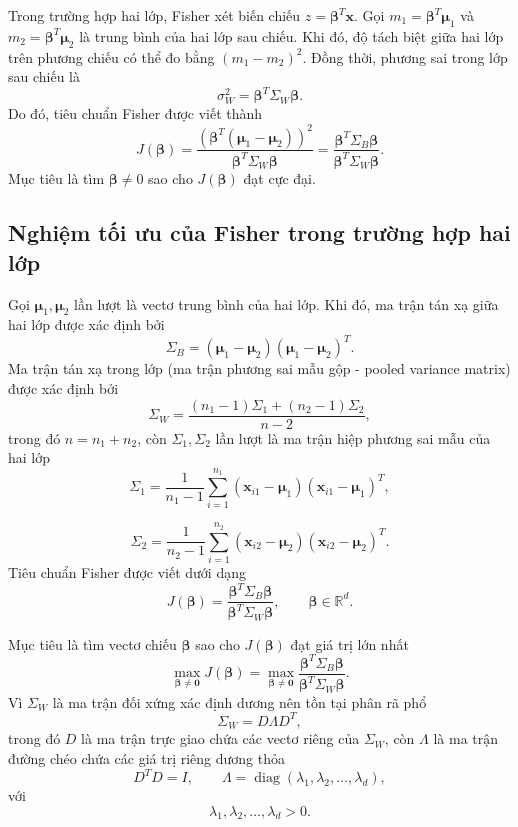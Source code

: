 Trong trường hợp hai lớp, Fisher xét biến chiếu $z = \bm{\beta}^T \bm{x}$. Gọi $m_1 = \bm{\beta}^T \bm{\mu}_1$ và $m_2 = \bm{\beta}^T \bm{\mu}_2$ là trung bình của hai lớp sau chiếu. Khi đó, độ tách biệt giữa hai lớp trên phương chiếu có thể đo bằng $(m_1-m_2)^2$. Đồng thời, phương sai trong lớp sau chiếu là
\begin{equation}
\sigma_W^2 = \bm{\beta}^T \Sigma_W \bm{\beta}.
\end{equation}
Do đó, tiêu chuẩn Fisher được viết thành
\begin{equation}
J(\bm{\beta})
=
\frac{(\bm{\beta}^T(\bm{\mu}_1-\bm{\mu}_2))^2}{\bm{\beta}^T \Sigma_W \bm{\beta}}
=
\frac{\bm{\beta}^T \Sigma_B \bm{\beta}}{\bm{\beta}^T \Sigma_W \bm{\beta}}.
\end{equation}
Mục tiêu là tìm $\bm{\beta} \neq 0$ sao cho $J(\bm{\beta})$ đạt cực đại.

\subsection{Nghiệm tối ưu của Fisher trong trường hợp hai lớp}
Gọi $\bm{\mu}_1,\bm{\mu}_2$ lần lượt là vectơ trung bình của hai lớp. Khi đó, ma trận tán xạ giữa hai lớp được xác định bởi
\[
\Sigma_B
=
(\bm{\mu}_1-\bm{\mu}_2)(\bm{\mu}_1-\bm{\mu}_2)^T.
\]
Ma trận tán xạ trong lớp (ma trận phương sai mẫu gộp - pooled variance matrix) được xác định bởi
\[
\Sigma_W
=
\frac{(n_1-1)\Sigma_1+(n_2-1)\Sigma_2}{n-2},
\]
trong đó $n=n_1+n_2$, còn $\Sigma_1,\Sigma_2$ lần lượt là ma trận hiệp phương sai mẫu của hai lớp
\[
\Sigma_1
=
\frac{1}{n_1-1}
\sum_{i=1}^{n_1}
(\bm{x}_{i1}-\bm{\mu}_1)(\bm{x}_{i1}-\bm{\mu}_1)^T,
\]

\[
\Sigma_2
=
\frac{1}{n_2-1}
\sum_{i=1}^{n_2}
(\bm{x}_{i2}-\bm{\mu}_2)(\bm{x}_{i2}-\bm{\mu}_2)^T.
\]
Tiêu chuẩn Fisher được viết dưới dạng
\[
J(\bm{\beta})
=
\frac{\bm{\beta}^T\Sigma_B\bm{\beta}}
{\bm{\beta}^T\Sigma_W\bm{\beta}},
\qquad
\bm{\beta}\in\mathbb{R}^d.
\]

Mục tiêu là tìm vectơ chiếu $\bm{\beta}$ sao cho $J(\bm{\beta})$  đạt giá trị lớn nhất
\[
\max_{\bm{\beta}\neq \bm{0}}
J(\bm{\beta})
=
\max_{\bm{\beta}\neq \bm{0}}
\frac{\bm{\beta}^T\Sigma_B\bm{\beta}}
{\bm{\beta}^T\Sigma_W\bm{\beta}}.
\]
Vì $\Sigma_W$ là ma trận đối xứng xác định dương nên tồn tại phân rã phổ
\[
\Sigma_W
=
D\Lambda D^T,
\]
trong đó $D$ là ma trận trực giao chứa các vectơ riêng của $\Sigma_W$, còn $\Lambda$ là ma trận đường chéo chứa các giá trị riêng dương thỏa
\[
D^TD=I,
\qquad
\Lambda
=
\operatorname{diag}(\lambda_1,\lambda_2,\ldots,\lambda_d),
\]
với
\[
\lambda_1,\lambda_2,\ldots,\lambda_d>0.
\]


